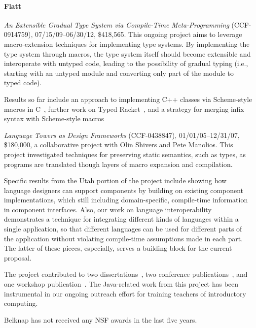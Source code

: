 \documentclass[11pt]{article}
\begin{document}
\paragraph{Flatt}

\textit{An Extensible Gradual Type System via Compile-Time
 Meta-Programming} (CCF-0914759), 07/15/09--06/30/12, \$418,565. This
ongoing project aims to leverage macro-extension techniques for
implementing type systems. By implementing the type system
through macros, the type system itself should become extensible and
interoperate with untyped code, leading to the possibility of gradual
typing (i.e., starting with an untyped module and converting only part
of the module to typed code).

Results so far include an approach to implementing C++ classes via
Scheme-style macros in C~\citep{Atkinson-ABI,Atkinson-SW}, further
work on Typed Racket~\citep{St-Amour-numeric,Tobin-Hochstadt-langs},
and a strategy for merging infix syntax with Scheme-style macros

\textit{Language Towers as Design Frameworks} (CCF-0438847),
01/01/05--12/31/07, \$180,000, a collaborative project with Olin
Shivers and Pete Manolios. This project investigated techniques for
preserving static semantics, such as types, as programs are translated
though layers of macro expansion and compilation.

Specific results from the Utah portion of the project include showing
how language designers can support components by building on existing
component implementations, which still including domain-specific,
compile-time information in component interfaces. Also, our work on
language interoperability demonstrates a technique for integrating
different kinds of languages within a single application, so that
different languages can be used for different parts of the application
without violating compile-time assumptions made in each part. The
latter of these pieces, especially, serves a building block for the
current proposal.

The project contributed to two
dissertations~\citep{Gray-thesis,Owens-thesis}, two conference
publications~\citep{MacroUnits,OwensUnits}, and one workshop
publication~\citep{JavatoScheme}. The Java-related work from this
project has been instrumental in our ongoing outreach effort for
training teachers of introductory computing.

\vspace{1ex}
\noindent
Belknap has not received any NSF awards in the last five years.
\end{document}
